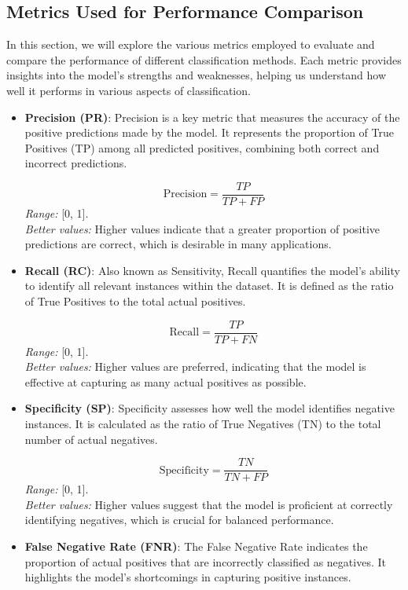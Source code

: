 \documentclass{article}
\begin{document}
\subsection{Metrics Used for Performance Comparison}

In this section, we will explore the various metrics employed to evaluate and compare the performance of different classification methods. Each metric provides insights into the model's strengths and weaknesses, helping us understand how well it performs in various aspects of classification.

\begin{itemize}
	\item \textbf{Precision (PR)}: Precision is a key metric that measures the accuracy of the positive predictions made by the model. It represents the proportion of True Positives (TP) among all predicted positives, combining both correct and incorrect predictions.
	
	\[
	\text{Precision} = \frac{TP}{TP + FP}
	\]
	\textit{Range:} [0, 1]. \\
	\textit{Better values:} Higher values indicate that a greater proportion of positive predictions are correct, which is desirable in many applications.
	
	\item \textbf{Recall (RC)}: Also known as Sensitivity, Recall quantifies the model's ability to identify all relevant instances within the dataset. It is defined as the ratio of True Positives to the total actual positives.
	
	\[
	\text{Recall} = \frac{TP}{TP + FN}
	\]
	\textit{Range:} [0, 1]. \\
	\textit{Better values:} Higher values are preferred, indicating that the model is effective at capturing as many actual positives as possible.
	
	\item \textbf{Specificity (SP)}: Specificity assesses how well the model identifies negative instances. It is calculated as the ratio of True Negatives (TN) to the total number of actual negatives.
	
	\[
	\text{Specificity} = \frac{TN}{TN + FP}
	\]
	\textit{Range:} [0, 1]. \\
	\textit{Better values:} Higher values suggest that the model is proficient at correctly identifying negatives, which is crucial for balanced performance.
	
	\item \textbf{False Negative Rate (FNR)}: The False Negative Rate indicates the proportion of actual positives that are incorrectly classified as negatives. It highlights the model's shortcomings in capturing positive instances.
	

\end{itemize}
\end{document}

